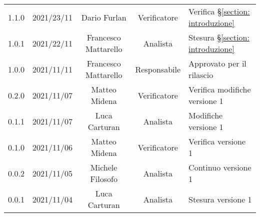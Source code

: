 \begin{center}
\begin{longtable}[c]{c | c | c | c | p{5cm}}
		1.1.0 & 2021/23/11 & Dario Furlan & Verificatore & Verifica §\ref{section: introduzione} \\
		1.0.1 & 2021/22/11 & Francesco Mattarello & Analista & Stesura §\ref{section: introduzione}\\
		1.0.0 & 2021/11/11 & Francesco Mattarello & Responsabile & Approvato per il rilascio\\
		0.2.0 & 2021/11/07 & Matteo Midena & Verificatore & Verifica modifiche versione 1\\
		0.1.1 & 2021/11/07 & Luca Carturan & Analista & Modifiche versione 1\\
		0.1.0 & 2021/11/06 & Matteo Midena & Verificatore & Verifica versione 1\\
		0.0.2 & 2021/11/05 & Michele Filosofo & Analista & Continuo versione 1\\
		0.0.1 & 2021/11/04 & Luca Carturan & Analista &Stesura versione 1\\

	\end{longtable}
\end{center}